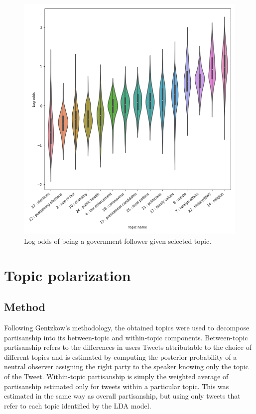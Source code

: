 \documentclass{article}
\begin{document}
	\begin{figure}
		\includegraphics[width=\columnwidth]{figures/topic_proba.png}
		\caption{Log odds of being a government follower given selected topic.}
		\label{fig:topic_proba}
	\end{figure}
	

	
	\clearpage
	
	
	\section*{Topic polarization}
	
	\subsection*{Method}
	
	Following Gentzkow’s methodology, the obtained topics were used to decompose partisanship into its between-topic and within-topic components. Between-topic partisanship refers to the differences in users Tweets attributable to the choice of different topics and is estimated by computing the posterior probability of a neutral observer assigning the right party to the speaker knowing only the topic of the Tweet. Within-topic partisanship is simply the weighted average of partisanship estimated only for tweets within a particular topic. This was estimated in the same way as overall partisanship, but using only tweets that refer to each topic identified by the LDA model. 
	
\end{document}
